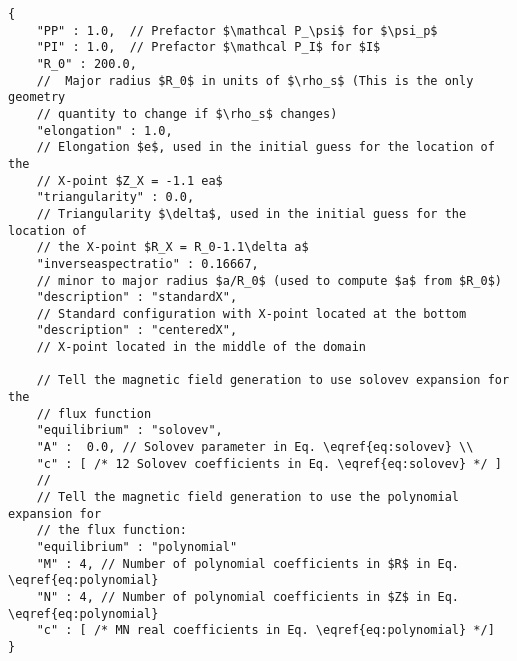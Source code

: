 \begin{verbatim}
{
    "PP" : 1.0,  // Prefactor $\mathcal P_\psi$ for $\psi_p$
    "PI" : 1.0,  // Prefactor $\mathcal P_I$ for $I$
    "R_0" : 200.0,
    //  Major radius $R_0$ in units of $\rho_s$ (This is the only geometry
    // quantity to change if $\rho_s$ changes)
    "elongation" : 1.0,
    // Elongation $e$, used in the initial guess for the location of the
    // X-point $Z_X = -1.1 ea$
    "triangularity" : 0.0,
    // Triangularity $\delta$, used in the initial guess for the location of
    // the X-point $R_X = R_0-1.1\delta a$
    "inverseaspectratio" : 0.16667,
    // minor to major radius $a/R_0$ (used to compute $a$ from $R_0$)
    "description" : "standardX",
    // Standard configuration with X-point located at the bottom
    "description" : "centeredX",
    // X-point located in the middle of the domain

    // Tell the magnetic field generation to use solovev expansion for the
    // flux function
    "equilibrium" : "solovev",
    "A" :  0.0, // Solovev parameter in Eq. \eqref{eq:solovev} \\
    "c" : [ /* 12 Solovev coefficients in Eq. \eqref{eq:solovev} */ ]
    //
    // Tell the magnetic field generation to use the polynomial expansion for
    // the flux function:
    "equilibrium" : "polynomial"
    "M" : 4, // Number of polynomial coefficients in $R$ in Eq. \eqref{eq:polynomial}
    "N" : 4, // Number of polynomial coefficients in $Z$ in Eq. \eqref{eq:polynomial}
    "c" : [ /* MN real coefficients in Eq. \eqref{eq:polynomial} */]
}
\end{verbatim}
